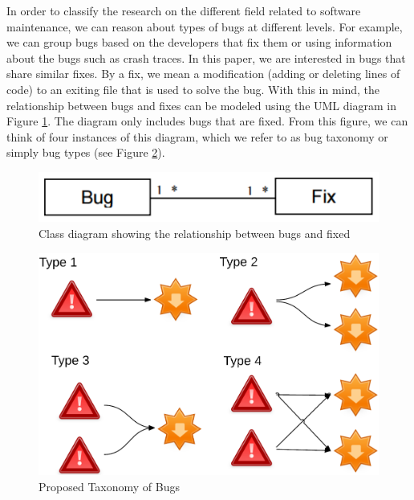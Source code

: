 
In order to classify the research on the different field related to software maintenance, we can reason about types of bugs at different levels. For
example, we can group bugs based on the developers that fix
them or using information about the bugs such as crash traces.
In this paper, we are interested in bugs that share similar fixes.
By a fix, we mean a modification (adding or deleting lines of
code) to an exiting file that is used to solve the bug. With this
in mind, the relationship between bugs and fixes can be
modeled using the UML diagram in Figure \ref{fig:bug-taxo-diag}. The diagram
only includes bugs that are fixed. From this figure, we can
think of four instances of this diagram, which we refer to as
bug taxonomy or simply bug types (see Figure \ref{fig:bug-taxo}).

\begin{figure}[h!]
  \centering
    \includegraphics[scale=0.5]{media/bug-taxo-class-diag.png}
    \caption{Class diagram showing the relationship between bugs and fixed
    \label{fig:bug-taxo-diag}}
\end{figure}

\begin{figure}[h!]
  \centering
    \includegraphics[scale=0.8]{media/bug-taxo.png}
    \caption{Proposed Taxonomy of Bugs
    \label{fig:bug-taxo}}
\end{figure}



